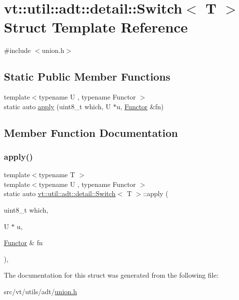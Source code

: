 \hypertarget{structvt_1_1util_1_1adt_1_1detail_1_1_switch_3_01_t_01_4}{}\section{vt\+:\+:util\+:\+:adt\+:\+:detail\+:\+:Switch$<$ T $>$ Struct Template Reference}
\label{structvt_1_1util_1_1adt_1_1detail_1_1_switch_3_01_t_01_4}


{\ttfamily \#include $<$union.\+h$>$}

\subsection*{Static Public Member Functions}
\begin{DoxyCompactItemize}
\item 
{\footnotesize template$<$typename U , typename Functor $>$ }\\static auto \hyperlink{structvt_1_1util_1_1adt_1_1detail_1_1_switch_3_01_t_01_4_a8a9400365190abff05867a578d5d0a50}{apply} (uint8\+\_\+t which, U $\ast$u, \hyperlink{namespacevt_af182285b57b225b163d5d8aff03cb8c2ac61e9f48e514369f0eb8ac5cebf9fb14}{Functor} \&fn)
\end{DoxyCompactItemize}


\subsection{Member Function Documentation}
\mbox{\label{structvt_1_1util_1_1adt_1_1detail_1_1_switch_3_01_t_01_4_a8a9400365190abff05867a578d5d0a50}} 
\subsubsection{\texorpdfstring{apply()}{apply()}}
{\footnotesize\ttfamily template$<$typename T $>$ \\
template$<$typename U , typename Functor $>$ \\
static auto \hyperlink{structvt_1_1util_1_1adt_1_1detail_1_1_switch}{vt\+::util\+::adt\+::detail\+::\+Switch}$<$ T $>$\+::apply (\begin{DoxyParamCaption}\item[{uint8\+\_\+t}]{which,  }\item[{U $\ast$}]{u,  }\item[{\hyperlink{namespacevt_af182285b57b225b163d5d8aff03cb8c2ac61e9f48e514369f0eb8ac5cebf9fb14}{Functor} \&}]{fn }\end{DoxyParamCaption})\hspace{0.3cm}{\ttfamily [inline]}, {\ttfamily [static]}}



The documentation for this struct was generated from the following file\+:\begin{DoxyCompactItemize}
\item 
src/vt/utils/adt/\hyperlink{union_8h}{union.\+h}\end{DoxyCompactItemize}
